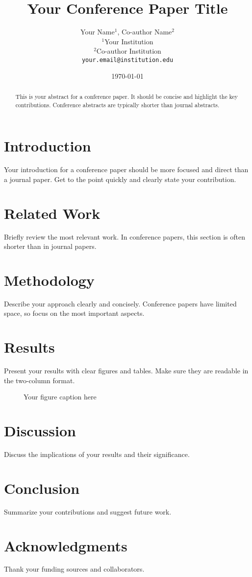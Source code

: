 \documentclass[10pt,twocolumn]{article}
\title{Your Conference Paper Title}
\author{Your Name$^1$, Co-author Name$^2$ \\
        $^1$Your Institution \\
        $^2$Co-author Institution \\
        \texttt{your.email@institution.edu}}
\date{\today}
\begin{document}
\maketitle

\begin{abstract}
This is your abstract for a conference paper. It should be concise and highlight the key contributions. Conference abstracts are typically shorter than journal abstracts.
\end{abstract}

\section{Introduction}
Your introduction for a conference paper should be more focused and direct than a journal paper. Get to the point quickly and clearly state your contribution.

\section{Related Work}
Briefly review the most relevant work. In conference papers, this section is often shorter than in journal papers.

\section{Methodology}
Describe your approach clearly and concisely. Conference papers have limited space, so focus on the most important aspects.

\section{Results}
Present your results with clear figures and tables. Make sure they are readable in the two-column format.

\begin{figure}[h]
\centering
\caption{Your figure caption here}
\label{fig:example}
\end{figure}

\section{Discussion}
Discuss the implications of your results and their significance.

\section{Conclusion}
Summarize your contributions and suggest future work.

\section*{Acknowledgments}
Thank your funding sources and collaborators.

\printbibliography

\balance
\end{document}
